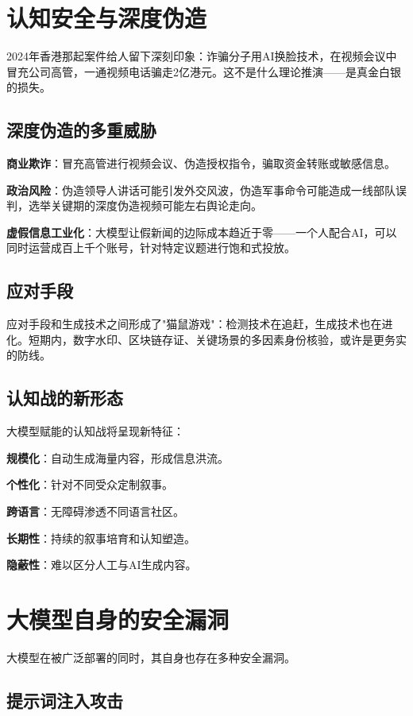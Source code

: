 \section{认知安全与深度伪造}

2024年香港那起案件给人留下深刻印象：诈骗分子用AI换脸技术，在视频会议中冒充公司高管，一通视频电话骗走2亿港元。这不是什么理论推演——是真金白银的损失。

\subsection{深度伪造的多重威胁}

\textbf{商业欺诈}：冒充高管进行视频会议、伪造授权指令，骗取资金转账或敏感信息。

\textbf{政治风险}：伪造领导人讲话可能引发外交风波，伪造军事命令可能造成一线部队误判，选举关键期的深度伪造视频可能左右舆论走向。

\textbf{虚假信息工业化}：大模型让假新闻的边际成本趋近于零——一个人配合AI，可以同时运营成百上千个账号，针对特定议题进行饱和式投放。

\subsection{应对手段}

应对手段和生成技术之间形成了"猫鼠游戏"：检测技术在追赶，生成技术也在进化。短期内，数字水印、区块链存证、关键场景的多因素身份核验，或许是更务实的防线。

\subsection{认知战的新形态}

大模型赋能的认知战将呈现新特征：

\textbf{规模化}：自动生成海量内容，形成信息洪流。

\textbf{个性化}：针对不同受众定制叙事。

\textbf{跨语言}：无障碍渗透不同语言社区。

\textbf{长期性}：持续的叙事培育和认知塑造。

\textbf{隐蔽性}：难以区分人工与AI生成内容。

\section{大模型自身的安全漏洞}

大模型在被广泛部署的同时，其自身也存在多种安全漏洞。

\subsection{提示词注入攻击}


